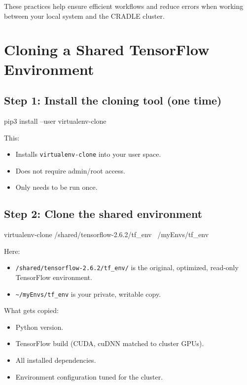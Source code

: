 \documentclass[11pt]{article}
\begin{document}
These practices help ensure efficient workflows and reduce errors when working
between your local system and the CRADLE cluster.


\section{Cloning a Shared TensorFlow Environment}
\label{sec:clone-env}

\subsection{Step 1: Install the cloning tool (one time)}

\begin{codeblock}
pip3 install --user virtualenv-clone
\end{codeblock}

This:
\begin{itemize}
  \item Installs \texttt{virtualenv-clone} into your user space.
  \item Does not require admin/root access.
  \item Only needs to be run once.
\end{itemize}

\subsection{Step 2: Clone the shared environment}

\begin{codeblock}
virtualenv-clone /shared/tensorflow-2.6.2/tf_env ~/myEnvs/tf_env
\end{codeblock}

Here:
\begin{itemize}
  \item \texttt{/shared/tensorflow-2.6.2/tf\_env/} is the original, optimized, read-only TensorFlow environment.
  \item \texttt{\textasciitilde/myEnvs/tf\_env} is your private, writable copy.
\end{itemize}

What gets copied:
\begin{itemize}
  \item Python version.
  \item TensorFlow build (CUDA, cuDNN matched to cluster GPUs).
  \item All installed dependencies.
  \item Environment configuration tuned for the cluster.
\end{itemize}
\end{document}
